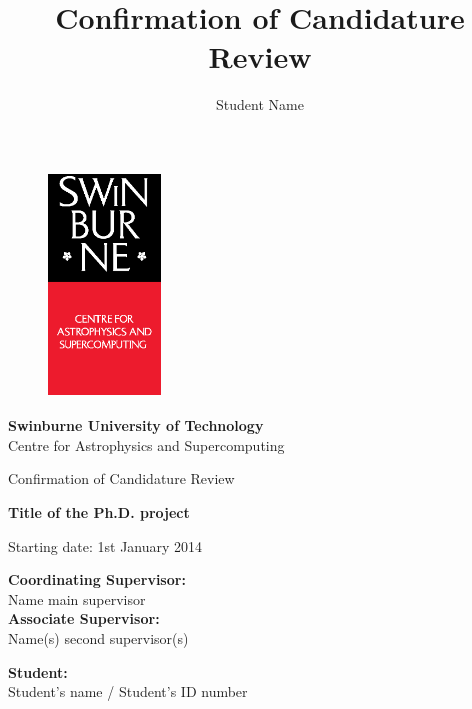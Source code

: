 \documentclass[useAMS,usenatbib,onecolumn]{mn2e}
\title{Confirmation of Candidature Review}
\author[Student Name]
 {Student Name}
\begin{document}
\fontsize{11}{12.5}\selectfont
\begin{center}

\begin{figure}
\begin{center}
\includegraphics[height=6cm,width=3cm]{./astro_v.eps}
\end{center}
\end{figure}

{\bf \LARGE S\Large winburne \LARGE U\Large niversity of  \LARGE T\Large echnology\\
\vspace{0.5cm}}
\LARGE C\Large entre for \LARGE A\Large strophysics and \LARGE S\Large upercomputing\\
\vspace{0.5cm}

\large Confirmation of Candidature Review\\
\vspace{0.5cm}



\Huge{\bf Title of the Ph.D. project}

\vspace{3cm}
\large{Starting date: 1st January 2014}
\end{center}


\begin{flushleft}
{\bf Coordinating Supervisor:}\\
Name main supervisor\\
\vspace{0.5cm}
{\bf Associate Supervisor:}\\
Name(s) second supervisor(s)\\
\end{flushleft}

\begin{flushright}
{\bf Student:}\\
Student's name / Student's ID number
\end{flushright}\hspace{8cm}
\end{document}
